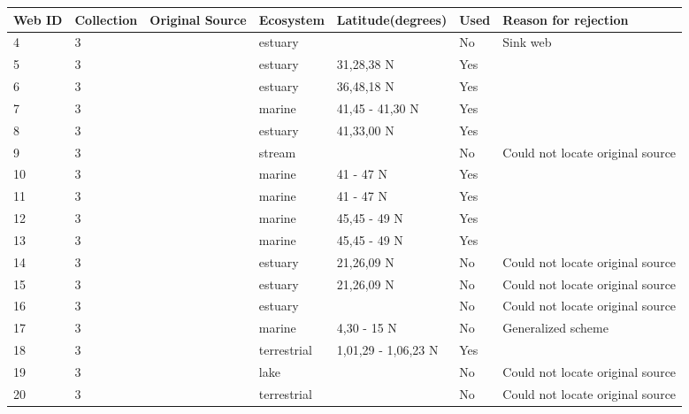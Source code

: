 \documentclass[12pt]{article}
\begin{document}
\begin{landscape}
    \begin{table}[h!]
    \centering
    {\footnotesize
      \begin{tabular}{p{2.8cm}p{1.3cm}p{5.5cm}p{2.2cm}p{2.5cm}lp{3.5cm}}
        \hline
        Web ID & Collection & Original Source & Ecosystem & Latitude(degrees) & Used  & Reason for rejection  \\
        \hline
        4     & 3 & \citet{Johnston1956}    & estuary &       & No    & Sink web \\
        5     & 3 & \citet{Teal1962}    & estuary & 31,28,38 N & Yes   &       \\
        6     & 3 & \citet{MacGinitie1935}    & estuary & 36,48,18 N & Yes   &       \\
        7     & 3 & \citet{Kremer1978}    & marine & 41,45 - 41,30 N & Yes   &       \\
        8     & 3 & \citet{Nixon1973}    & estuary & 41,33,00 N & Yes   &       \\
        9     & 3 & \citet{Kitching1967}  & stream &       & No    & Could not locate original source \\
        10    & 3 & \citet{Menge1976}    & marine & 41 - 47 N & Yes   &       \\
        11    & 3 & \citet{Menge1976}    & marine & 41 - 47 N & Yes   &       \\
        12    & 3 & \citet{Menge1976}    & marine & 45,45 - 49 N & Yes   &       \\
        13    & 3 & \citet{Menge1976}    & marine & 45,45 - 49 N & Yes   &       \\
        14    & 3 & \citet{Walsh1967}  & estuary & 21,26,09 N & No    & Could not locate original source \\
        15    & 3 & \citet{Walsh1967}  & estuary & 21,26,09 N & No    & Could not locate original source \\
        16    & 3 & \citet{Copeland1974}    & estuary &       & No    & Could not locate original source \\
        17    & 3 & \citet{Hiatt1960}  & marine & 4,30 - 15 N & No    & Generalized scheme \\
        18    & 3 & \citet{Niering1963a}  & terrestrial & 1,01,29 - 1,06,23 N & Yes   &       \\
        19    & 3 & \citet{Brooks1963}    & lake &       & No    & Could not locate original source \\
        20    & 3 & \citet{Knox1970}  & terrestrial &       & No    & Could not locate original source \\

\end{tabular}}
\end{table}
\end{landscape}
\end{document}
